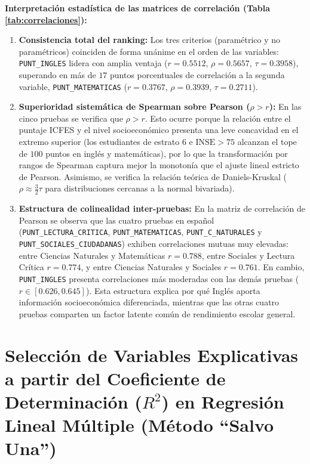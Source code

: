 \documentclass[11pt,letterpaper]{article}
\begin{document}
\textbf{Interpretación estadística de las matrices de correlación (Tabla \ref{tab:correlaciones}):}
\begin{enumerate}
    \item \textbf{Consistencia total del ranking:} Los tres criterios (paramétrico y no paramétricos) coinciden de forma unánime en el orden de las variables: \texttt{PUNT\_INGLES} lidera con amplia ventaja ($r = 0.5512$, $\rho = 0.5657$, $\tau = 0.3958$), superando en más de $17$ puntos porcentuales de correlación a la segunda variable, \texttt{PUNT\_MATEMATICAS} ($r = 0.3767$, $\rho = 0.3939$, $\tau = 0.2711$).
    \item \textbf{Superioridad sistemática de Spearman sobre Pearson ($\rho > r$):} En las cinco pruebas se verifica que $\rho > r$. Esto ocurre porque la relación entre el puntaje ICFES y el nivel socioeconómico presenta una leve concavidad en el extremo superior (los estudiantes de estrato 6 e $\text{INSE} > 75$ alcanzan el tope de $100$ puntos en inglés y matemáticas), por lo que la transformación por rangos de Spearman captura mejor la monotonía que el ajuste lineal estricto de Pearson. Asimismo, se verifica la relación teórica de Daniels-Kruskal ($\rho \approx \frac{3}{2}\tau$ para distribuciones cercanas a la normal bivariada).
    \item \textbf{Estructura de colinealidad inter-pruebas:} En la matriz de correlación de Pearson se observa que las cuatro pruebas en español (\texttt{PUNT\_LECTURA\_CRITICA}, \texttt{PUNT\_MATEMATICAS}, \texttt{PUNT\_C\_NATURALES} y \texttt{PUNT\_SOCIALES\_CIUDADANAS}) exhiben correlaciones mutuas muy elevadas: entre Ciencias Naturales y Matemáticas $r = 0.788$, entre Sociales y Lectura Crítica $r = 0.774$, y entre Ciencias Naturales y Sociales $r = 0.761$. En cambio, \texttt{PUNT\_INGLES} presenta correlaciones más moderadas con las demás pruebas ($r \in [0.626, 0.645]$). Esta estructura explica por qué Inglés aporta información socioeconómica diferenciada, mientras que las otras cuatro pruebas comparten un factor latente común de rendimiento escolar general.
\end{enumerate}

\section{Selección de Variables Explicativas a partir del Coeficiente de Determinación ($R^2$) en Regresión Lineal Múltiple (Método ``Salvo Una'')}
\end{document}
